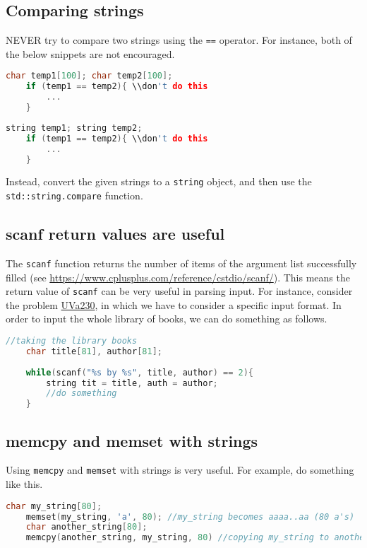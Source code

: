 \documentclass[12pt,a4paper]{amsart}
\numberwithin{equation}{section}
\theoremstyle{definition}
\begin{document}
\subsection{Comparing strings} NEVER try to compare two strings using the \verb|==| operator. For instance, both of the below snippets are not encouraged. 
\begin{lstlisting}[language=C++]
    char temp1[100]; char temp2[100];
    if (temp1 == temp2){ \\don't do this
        ...
    }
\end{lstlisting}

\begin{lstlisting}[language=C++]
    string temp1; string temp2;
    if (temp1 == temp2){ \\don't do this
        ...
    }
\end{lstlisting}
Instead, convert the given strings to a \verb|string| object, and then use the \verb|std::string.compare| function. 

\subsection{scanf return values are useful} The \verb|scanf| function returns the number of items of the argument list successfully filled (see \url{https://www.cplusplus.com/reference/cstdio/scanf/}). This means the return value of \verb|scanf| can be very useful in parsing input. For instance, consider the problem \href{https://onlinejudge.org/index.php?option=com_onlinejudge&Itemid=8&category=623&page=show_problem&problem=166}{UVa230}, in which we have to consider a specific input format. In order to input the whole library of books, we can do something as follows.
\begin{lstlisting}[language=C++]
    //taking the library books
    char title[81], author[81];
        
    while(scanf("%s by %s", title, author) == 2){
        string tit = title, auth = author;
        //do something
    }
\end{lstlisting}

\subsection{memcpy and memset with strings} Using \verb|memcpy| and \verb|memset| with strings is very useful. For example, do something like this. 
\begin{lstlisting}[language=C++]
    char my_string[80];
    memset(my_string, 'a', 80); //my_string becomes aaaa..aa (80 a's)
    char another_string[80];
    memcpy(another_string, my_string, 80) //copying my_string to another_string
\end{lstlisting}
\end{document}
